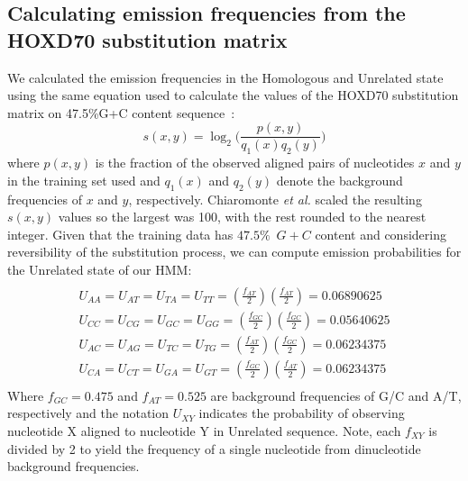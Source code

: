 \subsection*{Calculating emission frequencies from the HOXD70 substitution matrix}
We calculated the emission frequencies in the
Homologous and Unrelated state using the same equation used to
calculate the values of the HOXD70 substitution matrix on 47.5\%G+C
content sequence~\cite{hoxd}:
\begin{equation}
s(x,y)= \log_{2}{\Bigg(\frac{p(x,y)}{q_{1}(x)q_{2}(y)}\Bigg)}
\end{equation}
{w}here $p(x,y)$ is the fraction of the observed aligned pairs of
nucleotides $x$ and $y$ in the training set used and $q_{1}(x)$ and
$q_{2}(y)$ denote the background frequencies of $x$ and $y$,
respectively. Chiaromonte \textit{et al.} scaled the resulting
$s(x,y)$ values so the largest was 100,
with the rest rounded to the nearest integer.  Given that the training
data has $47.5\%$~$G+C$ content and considering reversibility of the substitution process, we can compute emission probabilities for the Unrelated state
of our HMM:
\begin{multline}\\
U_{AA}=U_{AT}=U_{TA}=U_{TT}=(\frac{f_{AT}}{2})(\frac{f_{AT}}{2})
= 0.06890625 \\
U_{CC}=U_{CG}=U_{GC}=U_{GG}=(\frac{f_{GC}}{2})(\frac{f_{GC}}{2}) =
0.05640625 \\
U_{AC}=U_{AG}=U_{TC}=U_{TG}=(\frac{f_{AT}}{2})(\frac{f_{GC}}{2}) =
0.06234375 \\
U_{CA}=U_{CT}=U_{GA}=U_{GT}=(\frac{f_{GC}}{2})(\frac{f_{AT}}{2}) =
0.06234375 \\
\end{multline}
Where $f_{GC}=0.475$ and $f_{AT}=0.525$ are background frequencies of
G/C and A/T, respectively and the notation $U_{XY}$ indicates the probability of observing nucleotide X aligned to
nucleotide Y in Unrelated sequence.    Note, each $f_{XY}$ is divided by 2 to yield the frequency of a single nucleotide from dinucleotide background frequencies.

